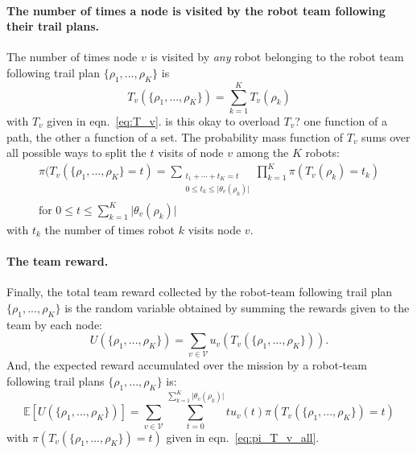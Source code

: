 \documentclass[11pt, oneside]{article}
\begin{document}
\paragraph{The number of times a node is visited by the robot team following their trail plans.} 
The number of times node $v$ is visited by \emph{any} robot belonging to the robot team following trail plan $\{\rho_1, ..., \rho_K\}$ is
\begin{equation}
	T_v(\{\rho_1, ..., \rho_K\} ) = \sum_{k=1}^K T_v(\rho_k)
\end{equation} with $T_v$ given in eqn.~\ref{eq:T_v}.
{\color{red} is this okay to overload $T_v$? one function of a path, the other a function of a set.}
The probability mass function of $T_v$ sums over all possible ways to split the $t$ visits of node $v$ among the $K$ robots:
\begin{multline}
	\pi(T_v(\{\rho_1, ..., \rho_K\} = t) = 
	\sum_{\substack{t_1 + \cdots + t_K = t \\ 0 \leq t_k \leq  \lvert \theta_v(\rho_k) \rvert}}
	\prod_{k=1}^K \pi(T_v(\rho_k)=t_k) \\
	\text{for } 0 \leq t \leq \sum_{k=1}^K \lvert \theta_v(\rho_k) \rvert \label{eq:pi_T_v_all}
\end{multline} with $t_k $ the number of times robot $k$ visits node $v$.



\paragraph{The team reward.}
Finally, the total team reward collected by the robot-team following trail plan $\{\rho_1, ..., \rho_K\}$ is the random variable obtained by summing the rewards given to the team by each node:
\begin{equation}
U(\{\rho_1,...,\rho_K\}) = \sum_{v\in\mathcal{V}} u_v\left ( T_v(\{\rho_1, ..., \rho_K\}) \right).
\end{equation}
And, the expected reward accumulated over the mission by a robot-team following trail plans $\{\rho_1, ..., \rho_K\}$ is:
\begin{equation}
	\mathbb{E}[U(\{\rho_1,...,\rho_K\})]= \sum_{v\in\mathcal{V}} \sum_{t= 0}^{\sum_{k=1}^K \lvert \theta_v(\rho_k) \rvert } t u_v(t) \pi(T_v(\{\rho_1, ..., \rho_K\}) = t)
\end{equation}
with $ \pi(T_v(\{\rho_1, ..., \rho_K\}) = t)$ given in eqn.~\ref{eq:pi_T_v_all}.
\end{document}
